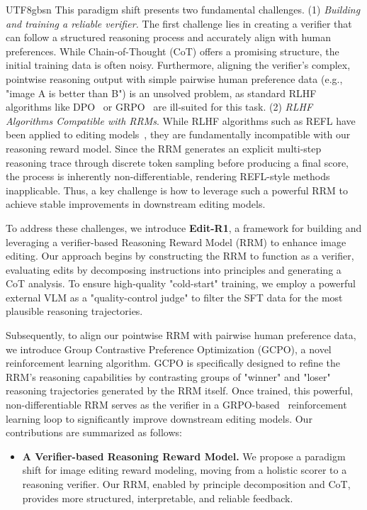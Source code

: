 \documentclass{llmxive}
\begin{document}
\begin{CJK*}{UTF8}{gbsn}
This paradigm shift presents two fundamental challenges.
 (1) \textit{Building and training a reliable verifier.} The first challenge lies in creating a verifier that can follow a structured reasoning process and accurately align with human preferences. While Chain-of-Thought (CoT) offers a promising structure, the initial training data is often noisy. Furthermore, aligning the verifier's complex, pointwise reasoning output with simple pairwise human preference data (e.g., "image A is better than B") is an unsolved problem, as standard RLHF algorithms like DPO~\cite{rafailov2023direct} or GRPO~\cite{guo2025deepseek} are ill-suited for this task.
 (2) \textit{RLHF Algorithms Compatible with RRMs}. While RLHF algorithms such as REFL have been applied to editing models~\citep{gong2025onereward,ren2024byteedit}, they are fundamentally incompatible with our reasoning reward model. Since the RRM generates an explicit multi-step reasoning trace through discrete token sampling before producing a final score, the process is inherently non-differentiable, rendering REFL-style methods inapplicable. Thus, a key challenge is how to leverage such a powerful RRM to achieve stable improvements in downstream editing models.


To address these challenges, we introduce \textbf{Edit-R1}, a framework for building and leveraging a verifier-based Reasoning Reward Model (RRM) to enhance image editing. Our approach begins by constructing the RRM to function as a verifier, evaluating edits by decomposing instructions into principles and generating a CoT analysis. To ensure high-quality "cold-start" training, we employ a powerful external VLM as a "quality-control judge" to filter the SFT data for the most plausible reasoning trajectories.

Subsequently, to align our pointwise RRM with pairwise human preference data, we introduce Group Contrastive Preference Optimization (GCPO), a novel reinforcement learning algorithm. 
GCPO is specifically designed to refine the RRM's reasoning capabilities by contrasting groups of "winner" and "loser" reasoning trajectories generated by the RRM itself. Once trained, this powerful, non-differentiable RRM serves as the verifier in a GRPO-based~\citep{xue2025dancegrpo, liu2025flow} reinforcement learning loop to significantly improve downstream editing models. Our contributions are summarized as follows:

\begin{itemize}[leftmargin=*]
    \item \textbf{A Verifier-based Reasoning Reward Model.} We propose a paradigm shift for image editing reward modeling, moving from a holistic scorer to a reasoning verifier. Our RRM, enabled by principle decomposition and CoT, provides more structured, interpretable, and reliable feedback.
    

\end{itemize}
\end{CJK*}
\end{document}

